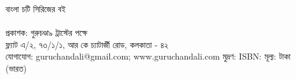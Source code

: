 \clearpage
\scriptsize
\raggedright 
বাংলা চটি সিরিজের বই\\
\textbf{\guruFullTitle}\\
\guruPublicationDetails
{}\baselineskip
প্রকাশক: গুরুচণ্ডা৯ ট্রাস্টের পক্ষে \guruPublisher \\
ফ্ল্যাট এ/২, ৭৩/১/১, আর কে চ্যাটার্জী রোড, কলকাতা - ৪২\\
যোগাযোগ: guruchandali@gmail.com; www.guruchandali.com
\baselineskip
মুদ্রণ: \guruPress
{}\baselineskip
\guruRobots 
{}\baselineskip
ISBN: \guruISBN
{}\baselineskip
মূল্য: \guruPrice টাকা (ভারত)\\
\baselineskip
\guruRights